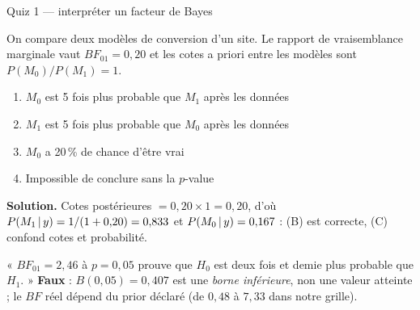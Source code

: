 \begin{frame}{Quiz 1 --- interpréter un facteur de Bayes}
\begin{qbox}
On compare deux modèles de conversion d'un site. Le rapport de vraisemblance
marginale vaut $BF_{01} = 0{,}20$ et les cotes a priori entre les modèles sont
$P(M_0)/P(M_1) = 1$.
\vspace{2mm}
\begin{enumerate}
  \item[(A)] $M_0$ est 5 fois plus probable que $M_1$ après les données
  \item[(B)] $M_1$ est 5 fois plus probable que $M_0$ après les données \quad \checkmark
  \item[(C)] $M_0$ a 20\,\% de chance d'être vrai
  \item[(D)] Impossible de conclure sans la $p$-value
\end{enumerate}
\vspace{2mm}
\textcolor{byBlue}{\textbf{Solution.}} Cotes postérieures $= 0{,}20 \times 1 = 0{,}20$,
d'où $P(M_1 \,\vert\, y) = 1/(1+0{,}20) = 0{,}833$ et $P(M_0 \,\vert\, y) = 0{,}167$ :
(B) est correcte, (C) confond cotes et probabilité.
\end{qbox}
\vspace{1mm}
\begin{kbox}
« $BF_{01} = 2{,}46$ à $p = 0{,}05$ prouve que $H_0$ est deux fois et demie plus probable
que $H_1$. »
\vspace{1mm}
\textbf{Faux} : $B(0{,}05) = 0{,}407$ est une \emph{borne inférieure}, non une valeur
atteinte ; le $BF$ réel dépend du prior déclaré (de $0{,}48$ à $7{,}33$ dans notre grille).
\end{kbox}
\end{frame}

